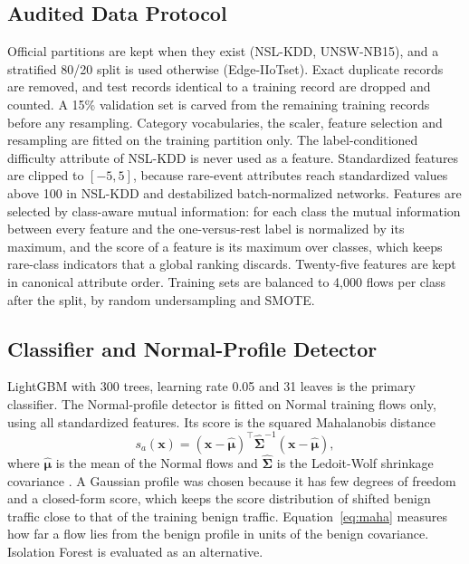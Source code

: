 \documentclass[journal]{IEEEtran}
\begin{document}
\subsection{Audited Data Protocol}
Official partitions are kept when they exist (NSL-KDD, UNSW-NB15), and a stratified 80/20 split is used otherwise (Edge-IIoTset). Exact duplicate records are removed, and test records identical to a training record are dropped and counted. A 15\% validation set is carved from the remaining training records before any resampling. Category vocabularies, the scaler, feature selection and resampling are fitted on the training partition only. The label-conditioned difficulty attribute of NSL-KDD is never used as a feature. Standardized features are clipped to $[-5,5]$, because rare-event attributes reach standardized values above 100 in NSL-KDD and destabilized batch-normalized networks. Features are selected by class-aware mutual information: for each class the mutual information between every feature and the one-versus-rest label is normalized by its maximum, and the score of a feature is its maximum over classes, which keeps rare-class indicators that a global ranking discards. Twenty-five features are kept in canonical attribute order. Training sets are balanced to 4,000 flows per class after the split, by random undersampling and SMOTE.

\subsection{Classifier and Normal-Profile Detector}
LightGBM with 300 trees, learning rate 0.05 and 31 leaves is the primary classifier. The Normal-profile detector is fitted on Normal training flows only, using all standardized features. Its score is the squared Mahalanobis distance
\begin{equation}
s_a(\mathbf{x})=(\mathbf{x}-\hat{\boldsymbol{\mu}})^{\top}\hat{\boldsymbol{\Sigma}}^{-1}(\mathbf{x}-\hat{\boldsymbol{\mu}}),
\label{eq:maha}
\end{equation}
where $\hat{\boldsymbol{\mu}}$ is the mean of the Normal flows and $\hat{\boldsymbol{\Sigma}}$ is the Ledoit-Wolf shrinkage covariance \cite{ledoit2004well}. A Gaussian profile was chosen because it has few degrees of freedom and a closed-form score, which keeps the score distribution of shifted benign traffic close to that of the training benign traffic. Equation~\eqref{eq:maha} measures how far a flow lies from the benign profile in units of the benign covariance. Isolation Forest \cite{liu2008isolation} is evaluated as an alternative.
\end{document}
